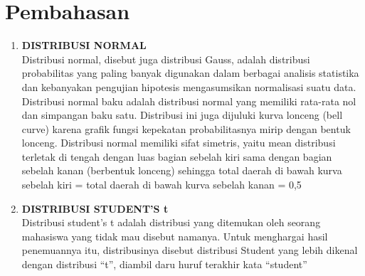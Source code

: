 \documentclass[a4paper,12pt]{article}
\begin{document}
\section{Pembahasan}
\begin{enumerate}[label=\textbf{\Alph*}.]
    \item \textbf{DISTRIBUSI NORMAL}\\
	Distribusi normal, disebut juga distribusi Gauss, adalah distribusi probabilitas yang paling banyak digunakan dalam berbagai analisis statistika dan kebanyakan pengujian hipotesis mengasumsikan normalisasi suatu data. 
    Distribusi normal baku adalah distribusi normal yang memiliki rata-rata nol dan simpangan baku satu. Distribusi ini juga dijuluki kurva lonceng (bell curve) karena grafik fungsi kepekatan probabilitasnya mirip dengan bentuk lonceng. Distribusi normal memiliki sifat simetris, yaitu mean distribusi terletak di tengah dengan luas bagian sebelah kiri sama dengan bagian sebelah kanan (berbentuk lonceng) sehingga total daerah di bawah kurva sebelah kiri = total daerah di bawah kurva sebelah kanan = 0,5	
    \item \textbf{DISTRIBUSI STUDENT'S t}\\
	Distribusi student’s t adalah distribusi yang ditemukan oleh seorang mahasiswa yang tidak mau disebut namanya. Untuk menghargai hasil penemuannya itu, distribusinya disebut distribusi Student yang lebih dikenal dengan distribusi “t”, diambil daru huruf terakhir kata “student”
\end{enumerate}
\newpage
\end{document}
